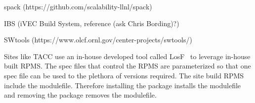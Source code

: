 spack (https://github.com/scalability-llnl/spack)

IBS (iVEC Build System, reference (ask Chris Bording)?)

SWtools (https://www.olcf.ornl.gov/center-projects/swtools/)

Sites like TACC use an in-house developed tool called
LosF~\cite{lmodSC11} to leverage in-house  built RPMS.  The spec files
that control the RPMS are parameterized so that one spec file can be
used to the plethora of versions required.  The site build RPMS
include the modulefile.  Therefore installing the package installs the
modulefile and removing the package removes the modulefile.

